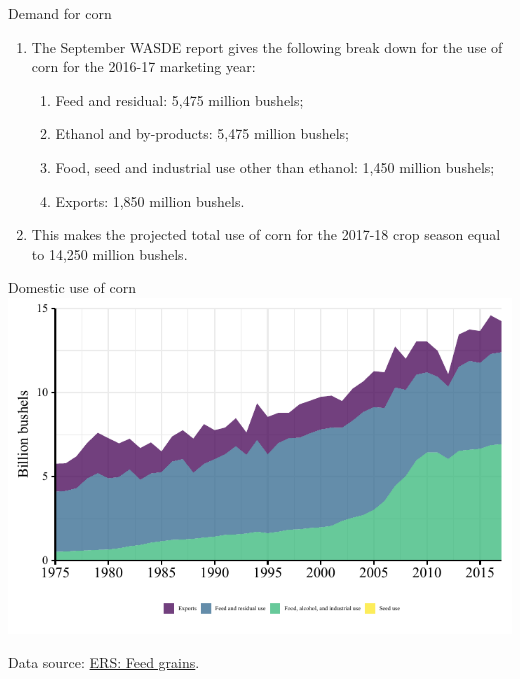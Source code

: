 \documentclass[table,xcolor=pdftex,dvipsnames, handout]{beamer}\usepackage[]{graphicx}\usepackage[]{color}
\makeatletter
\def\maxwidth{ %
  \ifdim\Gin@nat@width>\linewidth
    \linewidth
  \else
    \Gin@nat@width
  \fi
}
\newenvironment{knitrout}{}{} %
\makeatother
\begin{document}

\begin{frame}{Demand for corn}
\begin{enumerate}[label=\textbullet]
  \item The September WASDE report gives the following break down for the use of corn for the 2016-17 marketing year:
      \begin{enumerate}[label=-]
         \item Feed and residual: 5,475 million bushels;
         \item Ethanol and by-products: 5,475 million bushels;
         \item Food, seed and industrial use other than ethanol: 1,450 million bushels;
         \item Exports: 1,850 million bushels.
      \end{enumerate}
  \item This makes the projected total use of corn for the 2017-18 crop season equal to 14,250 million bushels.
\end{enumerate}
\end{frame}





\begin{frame}{Domestic use of corn}
\begin{knitrout}
\color{fgcolor}
\includegraphics[width=\maxwidth]{figure/figure_use-1} 

\end{knitrout}
\scriptsize
Data source: \href{https://www.ers.usda.gov/data-products/feed-grains-database/feed-grains-yearbook-tables/}{ERS: Feed grains}.
\end{frame}
\end{document}
